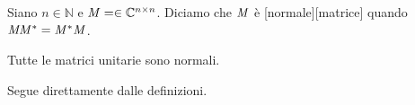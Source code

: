 \begin{Definition}
	Siano $n \in \mathbb{N}$ e $\mathit{M} = \in \mathbb{C}^{n \times n}$. Diciamo che $\mathit{M}$ \`e [normale][matrice] quando $\mathit{M}{\mathit{M}}^* = {\mathit{M}}^*\mathit{M}$.
\end{Definition}
\begin{Theorem}
	Tutte le matrici unitarie sono normali.
\end{Theorem}
\Proof Segue direttamente dalle definizioni. \EndProof

